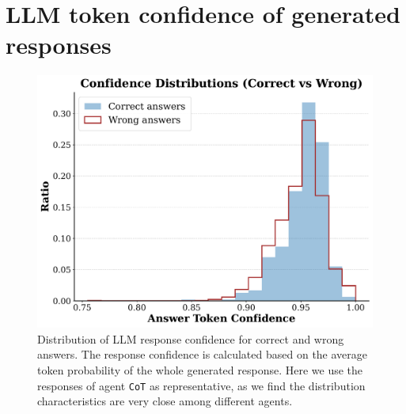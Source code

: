 \section{LLM token confidence of generated responses}
\label{appendix sec: LLM token confidence of generated responses}
\begin{figure}[ht]
  \centering
  \includegraphics[width=0.7\linewidth]{Figures/logprob_compare.pdf}
   \caption{Distribution of LLM response confidence for correct and wrong answers. The response confidence is calculated based on the average token probability of the whole generated response. Here we use the responses of agent \texttt{CoT} as representative, as we find the distribution characteristics are very close among different agents.}
   \label{fig:logprob_compare}
\end{figure}